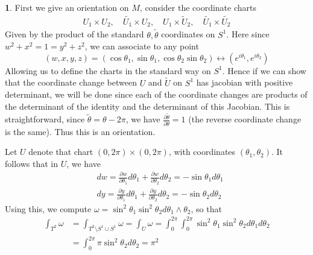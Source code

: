 \documentclass[10.5pt]{article}
\theoremstyle{definition}
\newtheorem{pb}{}
\begin{document}
    \begin{pb}
        First we give an orientation on \(M\), consider the coordinate charts
        \begin{align*}
            U_1 \times U_2, \quad \tilde{U_1} \times U_2, \quad U_1 \times \tilde U_2, \quad
            \tilde{U_1} \times \tilde{U_2}
        \end{align*}
        Given by the product of the standard \(\theta,\tilde{\theta}\) coordinates on \(S^1\). Here since \(w^2 + x^2 = 1 = y^2 + z^2\), we can associate to any point
        \[(w,x,y,z) = (\cos\theta_1,\sin\theta_1,\cos\theta_2\sin\theta_2) \longleftrightarrow (e^{i\theta_1},e^{i\theta_2})\]
        Allowing us to define the charts in the standard way on \(S^1\). Hence if we can show that the coordinate change between \(U\) and \(\tilde{U}\) on \(S^1\) has jacobian with positive determinant, we will be done since each of the coordinate changes are products of the determinant of the identity and the determinant of this Jacobian. This is straightforward, since \(\tilde{\theta} = \theta - 2\pi\), we have \(\frac{\partial \tilde{\theta}}{\partial \theta} = 1\) (the reverse coordinate change is the same). Thus this is an orientation.

        Let \(U\) denote that chart
        \((0,2\pi)\times(0,2\pi)\), with coordinates \((\theta_1,\theta_2)\).
        It follows that in \(U\), we have 
        \begin{align*}
            &dw = \frac{\partial w}{\partial \theta_1} d\theta_1 + \frac{\partial w}{\partial \theta_2} d\theta_2 = -\sin\theta_1 d\theta_1\\
            &dy = \frac{\partial y}{\partial \theta_1}d\theta_1 + \frac{\partial y}{\partial \theta_2}d\theta_2 = -\sin\theta_2 d\theta_2
        \end{align*}
        Using this, we compute
        \(\omega = \sin^2\theta_1\sin^2\theta_2 d\theta_1 \wedge \theta_2\), so that
        \begin{align*}
            \int_{T^2} \omega &= \int_{T^2 \setminus S^1 \cup S^1} \omega = \int_U \omega
            = \int_0^{2\pi}\int_0^{2\pi}\sin^2\theta_1\sin^2\theta_2 d\theta_1d\theta_2 \\
            &= \int_0^{2\pi}\pi\sin^2\theta_2d\theta_2 = \pi^2
        \end{align*}
    \end{pb}
\end{document}

